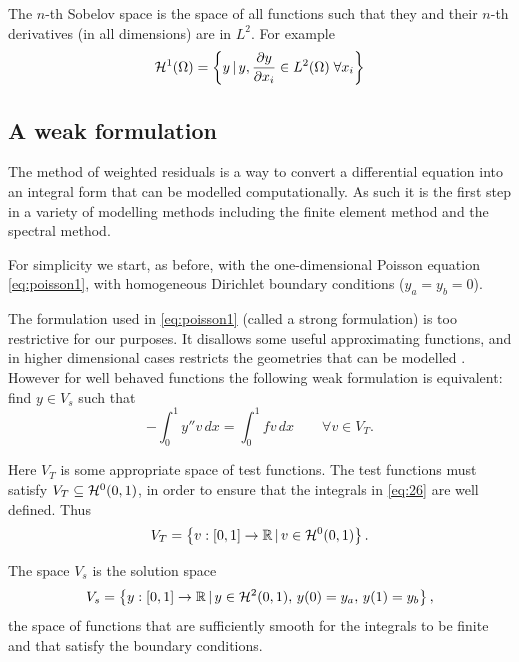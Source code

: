 The $n$-th Sobelov space is the space of all functions such that they and their $n$-th derivatives (in all dimensions) are in $L^2$. For example
\begin{equation}
  \label{eq:H1}
  \mathcal{H}^1(\Omega) = \left\{ { y \,|\, y, \frac{\partial y}{\partial x_i} \in L^2(\Omega) \; \forall x_i } \right\}
\end{equation}

\subsection{A weak formulation}
\label{Derivation-of-weighted-residuals}

The method of weighted residuals is a way to convert a differential equation
into an integral form that can be modelled computationally. As such it is the
first step in a variety of modelling methods including the finite element method
and the spectral method.

For simplicity we start, as before, with the one-dimensional Poisson equation
\cref{eq:poisson1}, with homogeneous Dirichlet boundary conditions
(\ie $y_{a}=y_{b}=0$).

The formulation used in \cref{eq:poisson1} (called a strong formulation) is too restrictive for our purposes.
It disallows some useful approximating functions, and in higher dimensional cases restricts the geometries that can be modelled \cite{HowardElmanDavidSilvester2006}. 
However for well behaved functions the following weak formulation is equivalent: find $y\in V_{s}$ such that
\begin{equation}
  -\int_{0}^{1}y''v\, dx=\int_{0}^{1}fv\, dx \qquad \forall v\in V_{T}.
  \label{eq:26}
\end{equation}

Here $V_{T}$ is some appropriate space of test functions. The test
functions must satisfy $V_{T}\subseteq \mathcal{H}^0(0,1)$, in order to ensure that the integrals in \cref{eq:26} are well defined. 
Thus
\begin{equation}
  \label{eq:28}
  V_{T}=\left\{ {v : [0,1] \rightarrow \mathbb{R} \,|\, v \in \mathcal{H}^0(0,1)} \right\}.
\end{equation}

The space $V_{s}$ is the solution space
\begin{equation}
  V_{s}=\left\{ { y : [0,1] \rightarrow \mathbb{R} \,|\, y \in \mathcal{H}^2(0,1),\, y(0) = y_{a},\, y(1) = y_{b}} \right\},
\end{equation}
\ie the space of functions that are sufficiently smooth for the integrals to be finite and that satisfy the boundary conditions.

